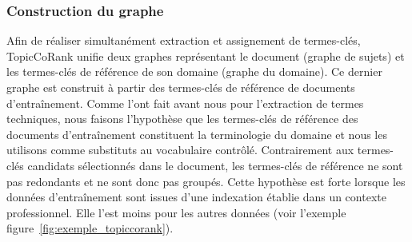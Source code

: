       \subsubsection{Construction du graphe}
      \label{subsubsec:main-domain_specific_keyphrase_annotation-supervised_automatic_keyphrase_extraction-topiccorank-graph_construction}
        Afin de réaliser simultanément extraction et assignement de termes-clés,
        TopicCoRank unifie deux graphes représentant le document (graphe de
        sujets) et les termes-clés de référence de son domaine (graphe du
        domaine). Ce dernier graphe est construit à partir des termes-clés de
        référence de documents d'entraînement. Comme  l'ont
        fait avant nous pour l'extraction de termes techniques, nous faisons
        l'hypothèse que les termes-clés de référence des documents
        d'entraînement constituent la terminologie du domaine et nous les
        utilisons comme substituts au vocabulaire contrôlé. Contrairement aux
        termes-clés candidats sélectionnés dans le document, les termes-clés de
        référence ne sont pas redondants et ne sont donc pas groupés. Cette
        hypothèse est forte lorsque les données d'entraînement sont
        issues d'une indexation établie dans un contexte professionnel. Elle
        l'est moins pour les autres données (voir l'exemple figure~\ref{fig:exemple_topiccorank}).

